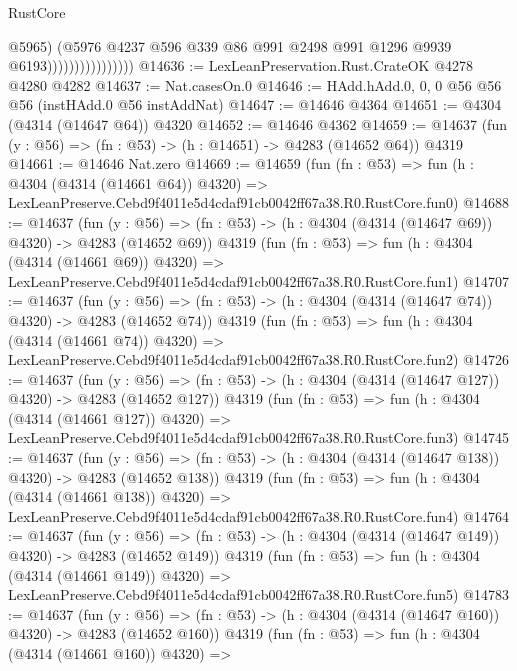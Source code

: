 \begin{lexlean}{RustCore}
\begin{coremodule}
                                    @5965)
                                  (@5976
                                    @4237
                                    @596
                                    @339
                                    @86
                                    @991
                                    @2498
                                    @991
                                    @1296
                                    @9939
                                    @6193))))))))))))))))
@14636 := LexLeanPreservation.Rust.CrateOK @4278 @4280 @4282
@14637 := Nat.casesOn.{0}
@14646 := HAdd.hAdd.{0, 0, 0} @56 @56 @56 (instHAdd.{0} @56 instAddNat)
@14647 := @14646 @4364
@14651 := @4304 (@4314 (@14647 @64)) @4320
@14652 := @14646 @4362
@14659 := @14637 (fun (y : @56) => (fn : @53) -> (h : @14651) -> @4283 (@14652 @64)) @4319
@14661 := @14646 Nat.zero
@14669 := @14659
    (fun (fn : @53) =>
    fun (h : @4304 (@4314 (@14661 @64)) @4320) =>
    LexLeanPreserve.Cebd9f4011e5d4cdaf91cb0042ff67a38.R0.RustCore.fun0)
@14688 := @14637
    (fun (y : @56) => (fn : @53) -> (h : @4304 (@4314 (@14647 @69)) @4320) -> @4283 (@14652 @69))
    @4319
    (fun (fn : @53) =>
    fun (h : @4304 (@4314 (@14661 @69)) @4320) =>
    LexLeanPreserve.Cebd9f4011e5d4cdaf91cb0042ff67a38.R0.RustCore.fun1)
@14707 := @14637
    (fun (y : @56) => (fn : @53) -> (h : @4304 (@4314 (@14647 @74)) @4320) -> @4283 (@14652 @74))
    @4319
    (fun (fn : @53) =>
    fun (h : @4304 (@4314 (@14661 @74)) @4320) =>
    LexLeanPreserve.Cebd9f4011e5d4cdaf91cb0042ff67a38.R0.RustCore.fun2)
@14726 := @14637
    (fun (y : @56) => (fn : @53) -> (h : @4304 (@4314 (@14647 @127)) @4320) -> @4283 (@14652 @127))
    @4319
    (fun (fn : @53) =>
    fun (h : @4304 (@4314 (@14661 @127)) @4320) =>
    LexLeanPreserve.Cebd9f4011e5d4cdaf91cb0042ff67a38.R0.RustCore.fun3)
@14745 := @14637
    (fun (y : @56) => (fn : @53) -> (h : @4304 (@4314 (@14647 @138)) @4320) -> @4283 (@14652 @138))
    @4319
    (fun (fn : @53) =>
    fun (h : @4304 (@4314 (@14661 @138)) @4320) =>
    LexLeanPreserve.Cebd9f4011e5d4cdaf91cb0042ff67a38.R0.RustCore.fun4)
@14764 := @14637
    (fun (y : @56) => (fn : @53) -> (h : @4304 (@4314 (@14647 @149)) @4320) -> @4283 (@14652 @149))
    @4319
    (fun (fn : @53) =>
    fun (h : @4304 (@4314 (@14661 @149)) @4320) =>
    LexLeanPreserve.Cebd9f4011e5d4cdaf91cb0042ff67a38.R0.RustCore.fun5)
@14783 := @14637
    (fun (y : @56) => (fn : @53) -> (h : @4304 (@4314 (@14647 @160)) @4320) -> @4283 (@14652 @160))
    @4319
    (fun (fn : @53) =>
    fun (h : @4304 (@4314 (@14661 @160)) @4320) =>

\end{coremodule}
\end{lexlean}
